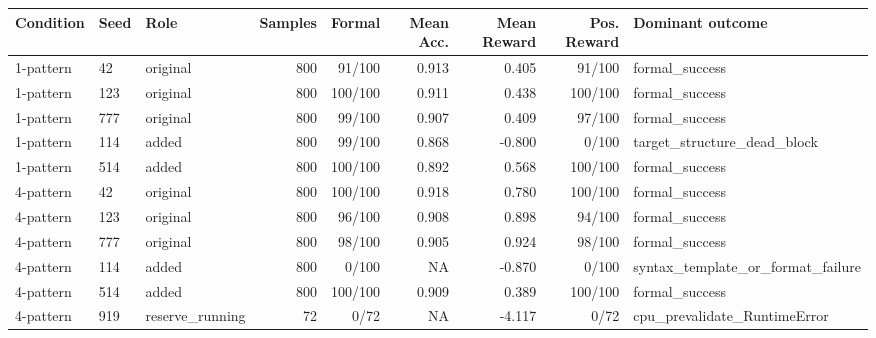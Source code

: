 \begin{tabular}{lllrrrrrl}
\toprule
Condition & Seed & Role & Samples & Formal & Mean Acc. & Mean Reward & Pos. Reward & Dominant outcome \\
\midrule
1-pattern & 42 & original & 800 & 91/100 & 0.913 & 0.405 & 91/100 & formal_success \\
1-pattern & 123 & original & 800 & 100/100 & 0.911 & 0.438 & 100/100 & formal_success \\
1-pattern & 777 & original & 800 & 99/100 & 0.907 & 0.409 & 97/100 & formal_success \\
1-pattern & 114 & added & 800 & 99/100 & 0.868 & -0.800 & 0/100 & target_structure_dead_block \\
1-pattern & 514 & added & 800 & 100/100 & 0.892 & 0.568 & 100/100 & formal_success \\
4-pattern & 42 & original & 800 & 100/100 & 0.918 & 0.780 & 100/100 & formal_success \\
4-pattern & 123 & original & 800 & 96/100 & 0.908 & 0.898 & 94/100 & formal_success \\
4-pattern & 777 & original & 800 & 98/100 & 0.905 & 0.924 & 98/100 & formal_success \\
4-pattern & 114 & added & 800 & 0/100 & NA & -0.870 & 0/100 & syntax_template_or_format_failure \\
4-pattern & 514 & added & 800 & 100/100 & 0.909 & 0.389 & 100/100 & formal_success \\
4-pattern & 919 & reserve_running & 72 & 0/72 & NA & -4.117 & 0/72 & cpu_prevalidate_RuntimeError \\
\bottomrule
\end{tabular}
